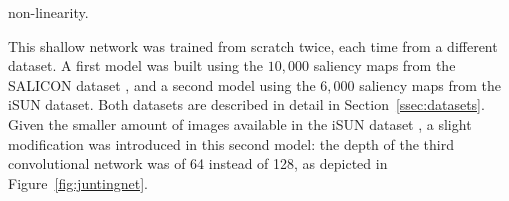 \documentclass[10pt,twocolumn,letterpaper]{article}
\begin{document}
non-linearity.%

This shallow network was trained from scratch twice, each time from a different dataset. 
A first model was built using the $10,000$ saliency maps from the SALICON dataset \cite{jiang2015salicon}, and a second model using the $6,000$ saliency maps from the iSUN dataset.
Both datasets are described in detail in Section~\ref{ssec:datasets}.
Given the smaller amount of images available in the iSUN dataset \cite{xu2015turkergaze}, a slight modification was introduced in this second model:
the depth of the third convolutional network was of 64 instead of 128, as depicted in Figure~\ref{fig:juntingnet}.
\end{document}
